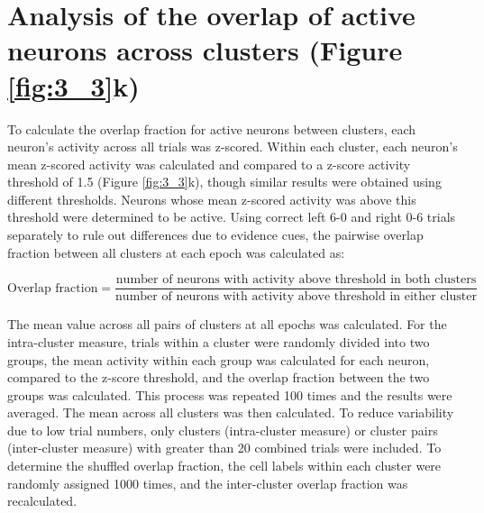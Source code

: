 \section[Analysis of the overlap of active neurons across clusters]{Analysis of the overlap of active neurons across clusters (Figure \ref{fig:3_3}k)} \label{methods:overlap}

To calculate the overlap fraction for active neurons between clusters, each neuron’s activity across all trials was z-scored. Within each cluster, each neuron’s mean z-scored activity was calculated and compared to a z-score activity threshold of 1.5 (Figure \ref{fig:3_3}k), though similar results were obtained using different thresholds. Neurons whose mean z-scored activity was above this threshold were determined to be active. Using correct left 6-0 and right 0-6 trials separately to rule out differences due to evidence cues, the pairwise overlap fraction between all clusters at each epoch was calculated as:

\vspace*{-30pt}

\begin{equation*}
\textrm{Overlap fraction} = \frac{\textrm{number of neurons with activity above threshold in both clusters}}{\textrm{number of neurons with activity above threshold in either cluster}}
\end{equation*}

The mean value across all pairs of clusters at all epochs was calculated. For the intra-cluster measure, trials within a cluster were randomly divided into two groups, the mean activity within each group was calculated for each neuron, compared to the z-score threshold, and the overlap fraction between the two groups was calculated. This process was repeated 100 times and the results were averaged. The mean across all clusters was then calculated. To reduce variability due to low trial numbers, only clusters (intra-cluster measure) or cluster pairs (inter-cluster measure) with greater than 20 combined trials were included. To determine the shuffled overlap fraction, the cell labels within each cluster were randomly assigned 1000 times, and the inter-cluster overlap fraction was recalculated. 
